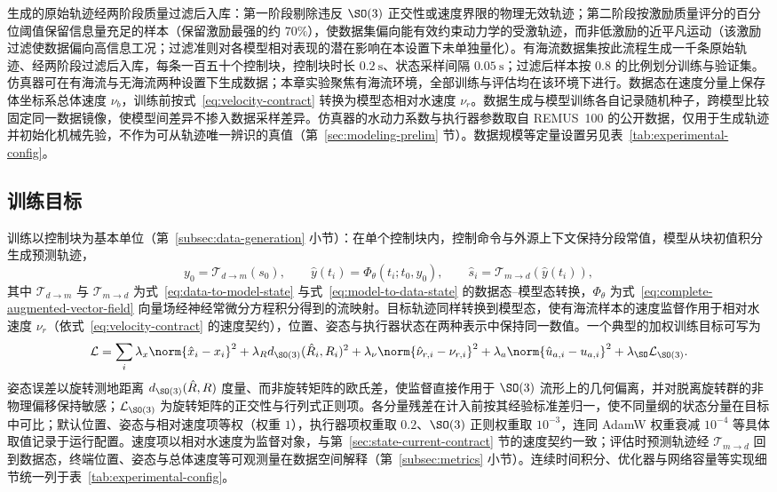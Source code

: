 生成的原始轨迹经两阶段质量过滤后入库：第一阶段剔除违反 \(\SO(3)\) 正交性或速度界限的物理无效轨迹；第二阶段按激励质量评分的百分位阈值保留信息量充足的样本（保留激励最强的约 \(70\%\)），使数据集偏向能有效约束动力学的受激轨迹，而非低激励的近平凡运动（该激励过滤使数据偏向高信息工况；过滤准则对各模型相对表现的潜在影响在本设置下未单独量化）。有海流数据集按此流程生成一千条原始轨迹、经两阶段过滤后入库，每条一百五十个控制块，控制块时长 \(0.2~\mathrm{s}\)、状态采样间隔 \(0.05~\mathrm{s}\)；过滤后样本按 \(0.8\) 的比例划分训练与验证集。仿真器可在有海流与无海流两种设置下生成数据；本章实验聚焦有海流环境，全部训练与评估均在该环境下进行。数据态在速度分量上保存体坐标系总体速度 \(\nu_b\)，训练前按式~\eqref{eq:velocity-contract} 转换为模型态相对水速度 \(\nu_r\)。数据生成与模型训练各自记录随机种子，跨模型比较固定同一数据镜像，使模型间差异不掺入数据采样差异。仿真器的水动力系数与执行器参数取自 REMUS~100 的公开数据，仅用于生成轨迹并初始化机械先验，不作为可从轨迹唯一辨识的真值（第~\ref{sec:modeling-prelim} 节）。数据规模等定量设置另见表~\ref{tab:experimental-config}。

\subsection{训练目标}
\label{subsec:training-objective}

训练以控制块为基本单位（第~\ref{subsec:data-generation} 小节）：在单个控制块内，控制命令与外源上下文保持分段常值，模型从块初值积分生成预测轨迹，
\begin{equation}
  y_0=\mathcal{T}_{d\to m}(s_0),\qquad
  \hat y(t_i)=\Phi_\theta(t_i;t_0,y_0),\qquad
  \hat s_i=\mathcal{T}_{m\to d}(\hat y(t_i)),
  \label{eq:block-prediction}
\end{equation}
其中 \(\mathcal{T}_{d\to m}\) 与 \(\mathcal{T}_{m\to d}\) 为式~\eqref{eq:data-to-model-state} 与式~\eqref{eq:model-to-data-state} 的数据态--模型态转换，\(\Phi_\theta\) 为式~\eqref{eq:complete-augmented-vector-field} 向量场经神经常微分方程积分得到的流映射。目标轨迹同样转换到模型态，使有海流样本的速度监督作用于相对水速度 \(\nu_r\)（依式~\eqref{eq:velocity-contract} 的速度契约），位置、姿态与执行器状态在两种表示中保持同一数值。一个典型的加权训练目标可写为
\begin{equation}
  \mathcal{L}
  =
  \sum_i
  \lambda_x\norm{\hat x_i-x_i}^2
  +\lambda_R d_{\SO(3)}(\hat R_i,R_i)^2
  +\lambda_\nu\norm{\hat\nu_{r,i}-\nu_{r,i}}^2
  +\lambda_a\norm{\hat u_{a,i}-u_{a,i}}^2
  +\lambda_{\SO}\mathcal{L}_{\SO(3)} .
  \label{eq:training-loss}
\end{equation}
姿态误差以旋转测地距离 \(d_{\SO(3)}(\hat R,R)\) 度量、而非旋转矩阵的欧氏差，使监督直接作用于 \(\SO(3)\) 流形上的几何偏离，并对脱离旋转群的非物理偏移保持敏感；\(\mathcal{L}_{\SO(3)}\) 为旋转矩阵的正交性与行列式正则项。各分量残差在计入前按其经验标准差归一，使不同量纲的状态分量在目标中可比；默认位置、姿态与相对速度项等权（权重 \(1\)），执行器项权重取 \(0.2\)、\(\SO(3)\) 正则权重取 \(10^{-3}\)，连同 AdamW 权重衰减 \(10^{-4}\) 等具体取值记录于运行配置。速度项以相对水速度为监督对象，与第~\ref{sec:state-current-contract} 节的速度契约一致；评估时预测轨迹经 \(\mathcal{T}_{m\to d}\) 回到数据态，终端位置、姿态与总体速度等可观测量在数据空间解释（第~\ref{subsec:metrics} 小节）。连续时间积分、优化器与网络容量等实现细节统一列于表~\ref{tab:experimental-config}。

